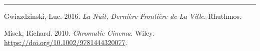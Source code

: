\documentclass[
  letterpaper,
  DIV=11,
  numbers=noendperiod,
  oneside]{scrartcl}
\newlength{\cslhangindent}
\newenvironment{CSLReferences}[2] %
 {\begin{list}{}{%
  \setlength{\itemindent}{0pt}
  \setlength{\leftmargin}{0pt}
  \setlength{\parsep}{0pt}
  \ifodd #1
   \setlength{\leftmargin}{\cslhangindent}
   \setlength{\itemindent}{-1\cslhangindent}
  \fi
  \setlength{\itemsep}{#2\baselineskip}}}
 {\end{list}}
\begin{document}
\begin{center}\rule{0.5\linewidth}{0.5pt}\end{center}

\label{refs}
\begin{CSLReferences}{1}{0}
Gwiazdzinski, Luc. 2016. \emph{La Nuit, Dernière Frontière de La Ville}.
Rhuthmos.

Misek, Richard. 2010. \emph{Chromatic Cinema}. Wiley.
\url{https://doi.org/10.1002/9781444320077}.

\end{CSLReferences}
\end{document}
